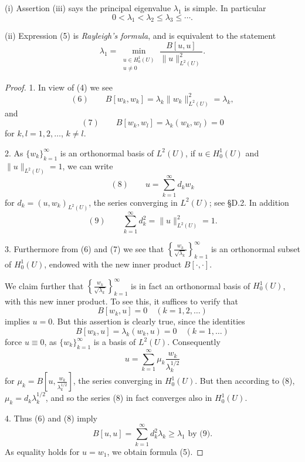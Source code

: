 \begin{remark}
\label{rem:principal-eigenvalue-simple-rayleigh}
(i) Assertion (iii) says the principal eigenvalue $\lambda_1$ is simple. In particular
$$0 < \lambda_1 < \lambda_2 \leq \lambda_3 \leq \cdots.$$

(ii) Expression (5) is \textit{Rayleigh's formula}, and is equivalent to the statement
$$\lambda_1 = \min_{\substack{u \in H_0^1(U) \\ u \neq 0}} \frac{B[u,u]}{\|u\|_{L^2(U)}^2}.$$
\end{remark}

\begin{proof}
1. In view of (4) we see
$$(6) \qquad B[w_k,w_k] = \lambda_k\|w_k\|_{L^2(U)}^2 = \lambda_k,$$
and
$$(7) \qquad B[w_k,w_l] = \lambda_k(w_k,w_l) = 0$$
for $k,l = 1,2,\ldots$, $k \neq l$.

2. As $\{w_k\}_{k=1}^\infty$ is an orthonormal basis of $L^2(U)$, if $u \in H_0^1(U)$ and $\|u\|_{L^2(U)} = 1$, we can write
$$(8) \qquad u = \sum_{k=1}^\infty d_kw_k$$
for $d_k = (u,w_k)_{L^2(U)}$, the series converging in $L^2(U)$; see \S D.2. In addition
$$(9) \qquad \sum_{k=1}^\infty d_k^2 = \|u\|_{L^2(U)}^2 = 1.$$

3. Furthermore from (6) and (7) we see that $\left\{\frac{w_k}{\sqrt{\lambda_k}}\right\}_{k=1}^\infty$ is an orthonormal subset of $H_0^1(U)$, endowed with the new inner product $B[\cdot,\cdot]$.

We claim further that $\left\{\frac{w_k}{\sqrt{\lambda_k}}\right\}_{k=1}^\infty$ is in fact an orthonormal basis of $H_0^1(U)$, with this new inner product. To see this, it suffices to verify that
$$B[w_k,u] = 0 \quad (k=1,2,\ldots)$$
implies $u = 0$. But this assertion is clearly true, since the identities
$$B[w_k,u] = \lambda_k(w_k,u) = 0 \quad (k=1,\ldots)$$
force $u \equiv 0$, as $\{w_k\}_{k=1}^\infty$ is a basis of $L^2(U)$. Consequently
$$u = \sum_{k=1}^\infty \mu_k\frac{w_k}{\lambda_k^{1/2}}$$
for $\mu_k = B\left[u,\frac{w_k}{\lambda_k^{1/2}}\right]$, the series converging in $H_0^1(U)$. But then according to (8), $\mu_k = d_k\lambda_k^{1/2}$, and so the series (8) in fact converges also in $H_0^1(U)$.

4. Thus (6) and (8) imply
$$B[u,u] = \sum_{k=1}^\infty d_k^2\lambda_k \geq \lambda_1 \text{ by (9)}.$$
As equality holds for $u = w_1$, we obtain formula (5).


\end{proof}
